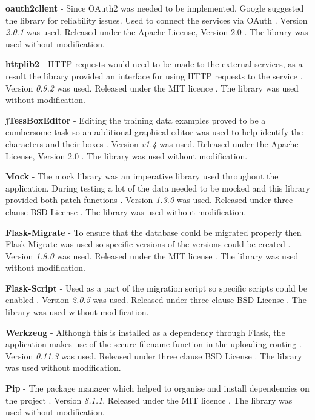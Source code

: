 \textbf{oauth2client} - Since OAuth2 was needed to be implemented, Google suggested the library for reliability issues. Used to connect the services via OAuth \cite{citeulike:14025877}. Version \textit{2.0.1} was used. Released under the Apache License, Version 2.0 \cite{apache_license}. The library was used without modification.

\textbf{httplib2} - HTTP requests would need to be made to the external services, as a result the library provided an interface for using HTTP requests to the service \cite{citeulike:14025936}. Version \textit{0.9.2} was used.  Released under the MIT licence \cite{citeulike:14025880}. The library was used without modification.

\textbf{jTessBoxEditor} - Editing the training data examples proved to be a cumbersome task so an additional graphical editor was used to help identify the characters and their boxes \cite{citeulike:13926798}. Version \textit{v1.4} was used.  Released under the Apache License, Version 2.0 \cite{apache_license}. The library was used without modification.

\textbf{Mock} - The mock library was an imperative library used throughout the application. During testing a lot of the data needed to be mocked and this library provided both patch functions \cite{citeulike:14020599}. Version \textit{1.3.0} was used. Released under three clause BSD License \cite{citeulike:14025861}. The library was used without modification.

\textbf{Flask-Migrate} - To ensure that the database could be migrated properly then Flask-Migrate was used so specific versions of the versions could be created \cite{citeulike:14025941}. Version \textit{1.8.0} was used.  Released under the MIT license \cite{citeulike:14025880}. The library was used without modification.

\textbf{Flask-Script} - Used as a part of the migration script so specific scripts could be enabled \cite{citeulike:14025943}. Version \textit{2.0.5} was used. Released under three clause BSD License \cite{citeulike:14025861}. The library was used without modification.

\textbf{Werkzeug} - Although this is installed as a dependency through Flask, the application makes use of the secure filename function in the uploading routing \cite{citeulike:14025945}. Version \textit{0.11.3} was used. Released under three clause BSD License \cite{citeulike:14025861}. The library was used without modification.

\textbf{Pip} - The package manager which helped to organise and install dependencies on the project \cite{citeulike:14025946}. Version \textit{8.1.1}. Released under the MIT licence \cite{citeulike:14025880}. The library was used without modification.

